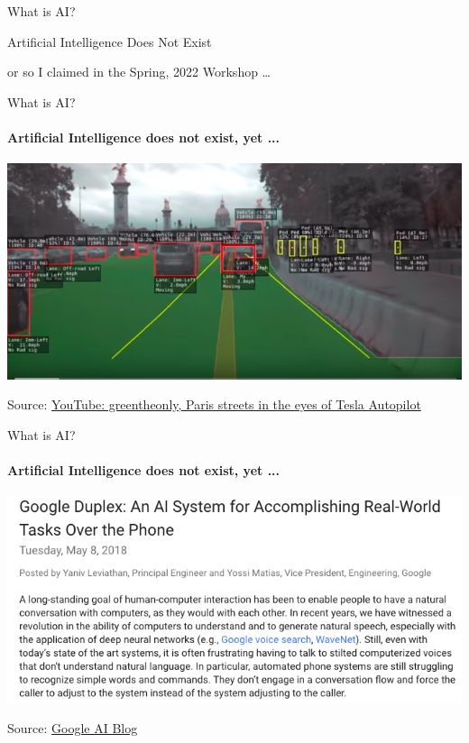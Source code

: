 \begin{frame}[c]{What is AI?}
  \begin{center}
    \huge Artificial Intelligence Does Not Exist
  \end{center}

\vspace{0.3\textheight}
or so I claimed in the Spring, 2022 Workshop \ldots
\end{frame}

\begin{frame}{What is AI?}
  \framesubtitle{Artificial Intelligence does not exist, yet ...}
  \includegraphics[width=\textwidth]{graphics/tesla_paris}

  Source: \href{https://www.youtube.com/watch?v=_1MHGUC_BzQs}{YouTube: greentheonly, Paris streets in the eyes of Tesla Autopilot}
  \end{frame}

  \begin{frame}{What is AI?}
  \framesubtitle{Artificial Intelligence does not exist, yet ...}
  \includegraphics[width=\textwidth]{graphics/google_duplex}

  Source: \href{https://ai.googleblog.com/2018/05/duplex-ai-system-for-natural-conversation.html}{Google AI Blog}
\end{frame}

